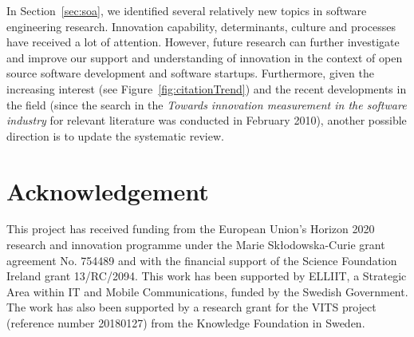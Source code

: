 \documentclass[sigconf,review]{acmart}
\newcommand{\theArticle}{\textit{Towards innovation measurement in the software industry}}
\begin{document}
In Section~\ref{sec:soa}, we identified several relatively new topics in software engineering research. Innovation capability, determinants, culture and processes have received a lot of attention. However, future research can further investigate and improve our support and understanding of innovation in the context of open source software development and software startups. Furthermore, given the increasing interest (see Figure~\ref{fig:citationTrend}) and the recent developments in the field (since the search in the \theArticle{} for relevant literature was conducted in February 2010), another possible direction is to update the systematic review. 
 
\section*{Acknowledgement}
This project has received funding from the European Union's Horizon 2020 research and innovation programme under the Marie Skłodowska-Curie grant agreement No. 754489 and with the financial support of the Science Foundation Ireland grant 13\slash RC\slash 2094. This work has been supported by ELLIIT, a Strategic Area within IT and Mobile Communications, funded by the Swedish Government. The work has also been supported by a research grant for the VITS project (reference number 20180127) from the Knowledge Foundation in Sweden.









\end{document}
